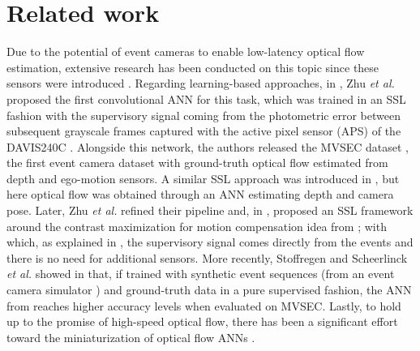 \section{Related work}

Due to the potential of event cameras to enable low-latency optical flow estimation, extensive research has been conducted on this topic since these sensors were introduced \cite{almatrafi2020distance,benosman2014eventbased,brosch2015eventbased,gallego2018unifying}. Regarding learning-based approaches, in \cite{zhu2018evflownet}, Zhu \textit{et al.} proposed the first convolutional ANN for this task, which was trained in an SSL fashion with the supervisory signal coming from the photometric error between subsequent grayscale frames captured with the active pixel sensor (APS) of the DAVIS240C \cite{brandli2014240}. Alongside this network, the authors released the MVSEC dataset \cite{zhu2018multivehicle}, the first event camera dataset with ground-truth optical flow estimated from depth and ego-motion sensors. A similar SSL approach was introduced in \cite{ye2020unsupervised}, but here optical flow was obtained through an ANN estimating depth and camera pose. Later, Zhu \textit{et al.} refined their pipeline and, in \cite{zhu2019unsupervised}, proposed an SSL framework around the contrast maximization for motion compensation idea from \cite{gallego2018unifying,gallego2019focus}; with which, as explained in , the supervisory signal comes directly from the events and there is no need for additional sensors. More recently, Stoffregen and Scheerlinck \textit{et al.} showed in \cite{stoffregen2020reducing} that, if trained with synthetic event sequences (from an event camera simulator \cite{rebecq2018esim}) and ground-truth data in a pure supervised fashion, the ANN from \cite{zhu2018evflownet,zhu2019unsupervised} reaches higher accuracy levels when evaluated on MVSEC. Lastly, to hold up to the promise of high-speed optical flow, there has been a significant effort toward the miniaturization of optical flow ANNs \cite{li2021lightweight,paredes-valles2021back}.

